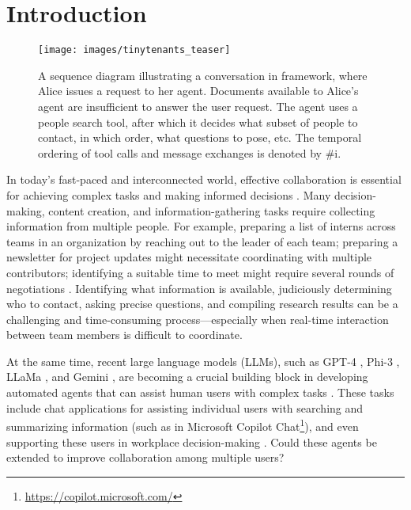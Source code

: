 \section{Introduction} 

\begin{figure*}
    \centering
    \texttt{[image: images/tinytenants\_teaser]}
    \caption{A sequence diagram illustrating a conversation in \asyncfw{} framework, where Alice issues a request to her agent. Documents available to Alice's agent are insufficient to answer the user request. The agent uses a people search tool, after which it decides what subset of people to contact, in which order, what questions to pose, etc. The temporal ordering of tool calls and message exchanges is denoted by \#i. }
    \label{fig:intro}
\end{figure*}


In today's fast-paced and interconnected world, effective collaboration is essential for achieving complex tasks and making informed decisions \cite{papachristou2023leveraging,gemp2024states}. 
Many decision-making, content creation, and information-gathering tasks require collecting information from multiple people. For example, preparing a list of interns across teams in an organization by reaching out to the leader of each team; preparing a newsletter for project updates might necessitate coordinating with multiple contributors; identifying a suitable time to meet might require several rounds of negotiations \cite{lin2024decision}. Identifying what information is available, judiciously determining who to contact, asking precise questions, and compiling research results can be a challenging and time-consuming process---especially when real-time interaction between team members is difficult to coordinate.

At the same time, recent large language models (LLMs), such as GPT-4 \cite{openai2023gpt4}, Phi-3 \cite{abdin2024phi}, LLaMa \cite{touvron2023llama}, and Gemini \cite{team2023gemini}, are becoming a crucial building block in developing automated agents that can assist human users with complex tasks
\cite{xi2023rise,wang2024survey,butler2023microsoft}.
These tasks include chat applications for assisting individual users with searching and summarizing information (such as in Microsoft Copilot Chat\footnote{\url{https://copilot.microsoft.com/}}), and even supporting these users in workplace decision-making \citep{butler2023microsoft,kim2024leveraginglargelanguagemodels}.
Could these agents be extended to improve collaboration among multiple users?

